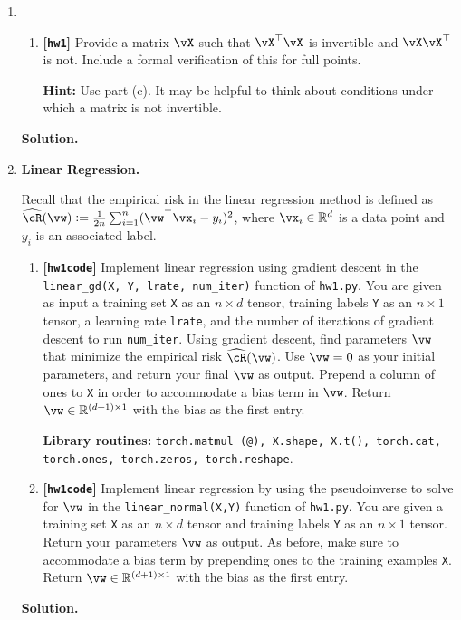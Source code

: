 \documentclass{article}
\def\R{\mathbb{R}}
\def\hcR{\widehat{\cR}}
\def\hw{\textbf{[\texttt{hw1}]}\xspace}
\def\hwcode{\textbf{[\texttt{hw1code}]}\xspace}
\theoremstyle{definition}
\theoremstyle{remark}
\newenvironment{Q}
{%
  \clearpage
  \item
  }
  {%
    \phantom{s} %
    \bigskip
    \textbf{Solution.}
  }
\begin{document}
\begin{enumerate}[font={\Large\bfseries},left=0pt]
\begin{Q}
\begin{enumerate}
    \textbf{Remark:} This characterizes when linear regression has a unique solution due to the normal equation (note that we always have at least one solution obtained by the pseudoinverse). We would not have had a unique solution for part (a) if some $n_i = 0$.
    
    \item \hw Provide a matrix $\vX$ such that $\vX^\top \vX$ is invertible and $\vX\vX^\top$ is not. Include a formal verification of this for full points.
    
    \textbf{Hint:} Use part (c). It may be helpful to think about conditions under which a matrix is not invertible.
    
    
  \end{enumerate}
  \end{Q}


    \begin{Q}
      \textbf{\Large Linear Regression.}

      Recall that the empirical risk in the linear regression method is defined as $\hcR(\vw) := \frac{1}{2n}\sum_{i=1}^n (\vw^\top \vx_i - y_i)^2$, where $\vx_i \in \R^d$ is a data point and $y_i$ is an associated label.
      \begin{enumerate}
        \item \hwcode Implement linear regression using gradient descent in the \texttt{linear\_gd(X, Y, lrate, num\_iter)} function of \texttt{hw1.py}. You are given as input a training set \texttt{X} as an $n \times d$ tensor, training labels \texttt{Y} as an $n \times 1$ tensor, a learning rate \texttt{lrate}, and the number of iterations of gradient descent to run \texttt{num\_iter}.  Using gradient descent, find parameters $\vw$ that minimize the empirical risk $\hcR(\vw)$. Use $\vw = 0$ as your initial parameters, and return your final $\vw$ as output. Prepend a column of ones to \texttt{X} in order to accommodate a bias term in $\vw$. Return $\vw \in \R^{(d+1)\times 1}$ with the bias as the first entry.

          \textbf{Library routines:} \texttt{torch.matmul (@), X.shape, X.t(), torch.cat, torch.ones, torch.zeros, torch.reshape}.

        \item \hwcode Implement linear regression by using the pseudoinverse to solve for $\vw$ in the \texttt{linear\_normal(X,Y)} function of \texttt{hw1.py}. You are given a training set \texttt{X} as an $n \times d$ tensor and training labels \texttt{Y} as an $n \times 1$ tensor. Return your parameters $\vw$ as output. As before, make sure to accommodate a bias term by prepending ones to the training examples \texttt{X}. Return $\vw \in \R^{(d+1)\times 1}$ with the bias as the first entry.


\end{enumerate}
\end{Q}
\end{enumerate}
\end{document}
